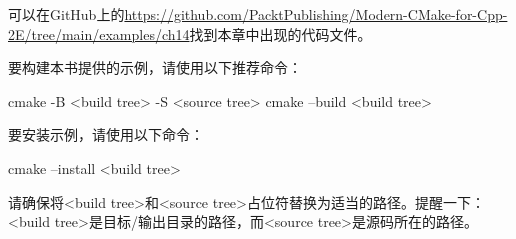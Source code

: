 可以在GitHub上的\url{https://github.com/PacktPublishing/Modern-CMake-for-Cpp-2E/tree/main/examples/ch14}找到本章中出现的代码文件。

要构建本书提供的示例，请使用以下推荐命令：

\begin{shell}
cmake -B <build tree> -S <source tree>
cmake --build <build tree>
\end{shell}

要安装示例，请使用以下命令：

\begin{shell}
cmake --install <build tree>
\end{shell}

请确保将<build tree>和<source tree>占位符替换为适当的路径。提醒一下：<build tree>是目标/输出目录的路径，而<source tree>是源码所在的路径。





